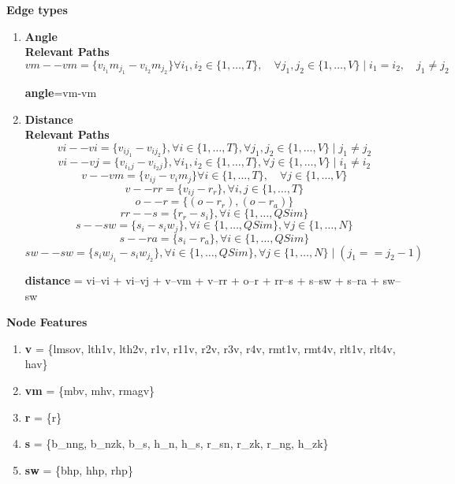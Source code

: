 \documentclass{report} %
\begin{document}
\textbf{Edge types}

\begin{enumerate}
    \item \textbf{Angle} \\
    \textbf{Relevant Paths}
    \[
    vm--vm = \{ v_{i_{1}}m_{j_{1}} - v_{i_{2}}m_{j_{2}} \}
    \forall i_1, i_2 \in \{1, \dots, T\}, \quad \forall j_1, j_2 \in \{1, \dots, V\} \mid
    i_1 = i_2, \quad j_1 \neq j_2
    \]

    \textbf{angle}=vm-vm

    \item \textbf{Distance} \\
    \textbf{Relevant Paths}
    \[
        vi--vi = \{v_{i j_1} - v_{i j_2}\}, \forall i \in \{1, \dots, T\}, \forall j_1, j_2 \in \{1, \dots, V\} \mid  j_1 \neq j_2
    \]
    \[
        vi--vj = \{v_{i_1 j} - v_{i_2 j}\}, \forall i_1, i_2 \in \{1, \dots, T\}, \forall j \in \{1, \dots, V\} \mid  i_1 \neq i_2
    \]
    \[
        v--vm = \{v_{i j} - v_{i}m_{j}\} \forall i  \in \{1, \dots, T\}, \quad \forall j \in \{1, \dots, V\}
    \]
    \[
        v--rr = \{v_{i j} - r_{r}\}, \forall i, j  \in \{1, \dots, T\}
    \]
    \[
        o--r = \{ (o - r_{r}), (o - r_{a})\}
    \]
    \[
        rr--s = \{r_{r} - s_{i}\}, \forall i  \in \{1, \dots, QSim\}
    \]
    \[
        s--sw = \{s_{i} - s_{i}w_{j}\}, \forall i  \in \{1, \dots, QSim\}, \forall j  \in \{1, \dots, N\}
    \]
    \[
        s--ra = \{s_{i} - r_{a}\}, \forall i  \in \{1, \dots, QSim\}
    \]
    \[
        sw--sw = \{s_{i}w_{j_1} - s_{i}w_{j_2}\}, \forall i  \in \{1, \dots, QSim\}, \forall j  \in \{1, \dots, N\} \mid (j_1 == j_2-1)
    \]

    \textbf{distance} = vi--vi + vi--vj + v--vm + v--rr + o--r + rr--s + s--sw + s--ra + sw--sw

\end{enumerate}

\textbf{Node Features}

\begin{enumerate}

    \item \textbf{v} = \{lmsov, lth1v, lth2v, r1v, r11v, r2v, r3v, r4v, rmt1v, rmt4v, rlt1v, rlt4v, hav\}

    \item \textbf{vm} = \{mbv, mhv, rmagv\}

    \item \textbf{r} = \{r\}

    \item \textbf{s} = \{b\_nng, b\_nzk, b\_s, h\_n, h\_s, r\_sn, r\_zk, r\_ng, h\_zk\}

    \item \textbf{sw} = \{bhp, hhp, rhp\}
\end{enumerate}
\end{document}
